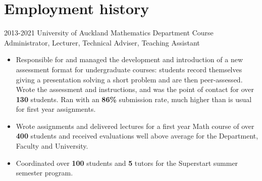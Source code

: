 \documentclass[hidelinks, 10pt]{article} %
\begin{document}
%
%
%
%


\section{Employment history}

\job
{2013-2021}{}
{University of Auckland Mathematics Department}
{}
{Course Administrator, Lecturer, Technical Adviser, Teaching Assistant}
{
    \begin{itemize}
        \item Responsible for and managed the development and introduction of a new assessment format for undergraduate courses: students record themselves giving a presentation solving a short problem and are then peer-assessed.
              Wrote the assessment and instructions, and was the point of contact for over \textbf{130} students.
              Ran with an \textbf{86\%} submission rate, much higher than is usual for first year assignments.

        \item Wrote assignments and delivered lectures for a first year Math course of over \textbf{400} students and received evaluations well above average for the Department, Faculty and University. 

        \item Coordinated over \textbf{100} students and \textbf{5} tutors for the Superstart summer semester program.

    \end{itemize}
}
\end{document}
